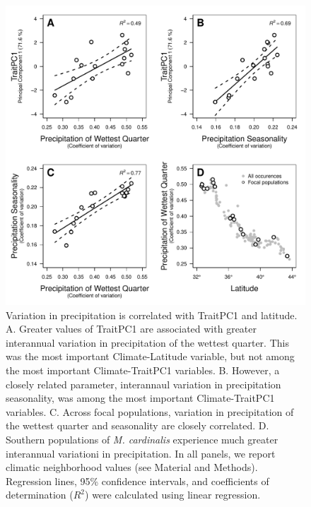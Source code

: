 \documentclass[11pt, oneside]{article}
\begin{document}

\begin{figure}[h!]
	\centerline{\includegraphics[width=1\textwidth]{Figures/Figure_ClimPC1.pdf}}
	\fontsize{10}{12}
	\selectfont
	\caption[Variation in precipitation is correlated with TraitPC1 and latitude]{Variation in precipitation is correlated with TraitPC1 and latitude. A. Greater values of TraitPC1 are associated with greater interannual variation in precipitation of the wettest quarter. This was the most important Climate-Latitude variable, but not among the most important Climate-TraitPC1 variables. B. However, a closely related parameter, interannaul variation in precipitation seasonality, was among the most important Climate-TraitPC1 variables. C. Across focal populations, variation in precipitation of the wettest quarter and seasonality are closely correlated. D. Southern populations of \textit{M. cardinalis} experience much greater interannual variationi in precipitation. In all panels, we report climatic neighborhood values (see Material and Methods). Regression lines, 95\% confidence intervals, and coefficients of determination ($R^2$) were calculated using linear regression.}
	\label{fig:Fig_ClimPC1}
\end{figure}
\end{document}
